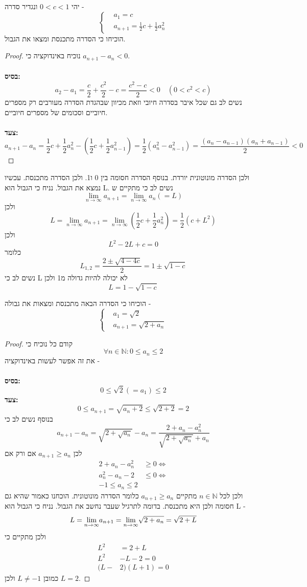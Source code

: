 \documentclass{article}
\begin{document}
\begin{exercise}
יהי 
$0<c<1$
ונגדיר סדרה - 
\[\begin{cases}&a_1 = c\\ &a_{n+1}=\frac{1}{2}c+\frac{1}{2}a_n^2\end{cases}\]
הוכיחו כי הסדרה מתכנסת ומצאו את הגבול.
\end{exercise}
\begin{proof}
נוכיח באינדוקציה כי 
$a_{n+1}-a_n<0$. \\\\
\textbf{בסיס:}
\[a_2-a_1=\frac{c}{2}+\frac{c^2}{2}-c = \frac{c^2-c}{2}<0 \quad(0<c^2<c)\]
נשים לב גם שכל איבר בסדרה חיובי וזאת מכיוון שבהגדת הסדרה מעורבים רק מספרים חיוביים וסכומים  של מספרים חיוביים. \\\\
\textbf{צעד:} 
\[a_{n+1}-a_n = \frac{1}{2} c+\frac{1}{2}a_n^2 - \left(\frac{1}{2}c+\frac{1}{2} a_{n-1}^2\right) = \frac{1}{2}\left(a_n^2-a_{n-1}^2\right)=\frac{(a_n-a_{n-1})(a_n+a_{n-1})}{2}<0\]
\end{proof}
 ולכן הסדרה מונוטונית יורדת. בנוסף הסדרה חסומה בין 0 ו1. ולכן הסדרה מתכנסת. עכשיו נמצא את הגבול. נניח כי הגבול הוא L. נשים לב כי מתקיים ש 
\[\underset{n\rightarrow\infty}{\lim} a_{n+1} = \underset{n\rightarrow\infty}{\lim}a_n(=L)\]
ולכן 
\[L=\underset{n\rightarrow\infty}{\lim} a_{n+1} = \underset{n\rightarrow\infty}{\lim}\left(\frac{1}{2}c+\frac{1}{2}a_n^2\right) = \frac{1}{2}\left(c+L^2\right) \]
ולכן 
\[L^2-2L+c=0\]
כלומר 
\[L_{1,2}=\frac{2\pm \sqrt{4-4c}}{2} = 1\pm \sqrt{1-c}\]
נשים לב כי L לא יכולה להיות גדולה מ1 ולכן 
\[L=1-\sqrt{1-c}\]
\begin{exercise}
הוכיחו כי הסדרה הבאה מתכנסת ומצאות את גבולה - 
\[\begin{cases}&a_1= \sqrt{2} \\ &a_{n+1}= \sqrt{2+a_n}\end{cases}\]
\end{exercise}
\begin{proof}
קודם כל נוכיח כי 
\[\forall n\in\mathbb{N}: 0\leq a_n\leq 2\]
את זה אפשר לעשות באינדוקציה - \\\\
\textbf{בסיס:}
\[0\leq\sqrt{2}(=a_1)\leq 2\]
\textbf{צעד:}
\[0\leq a_{n+1}=\sqrt{a_n+2}\leq \sqrt{2+2} =2\]
בנוסף נשים לב כי
\[a_{n+1}-a_n = \sqrt{2+\sqrt{a_n}}-a_n = \frac{2+a_n-a_n^2}{\sqrt{2+\sqrt{a_n}} +a_n}\]
לכן 
$a_{n+1}\geq a_n$
אם ורק אם 
\begin{align*}
2+a_n-a_n^2&\geq 0 \Longleftrightarrow\\
a_n^2-a_n-2&\leq 0 \Longleftrightarrow \\
-1\leq a_n\leq 2
\end{align*}
ולכן לכל 
$n\in\mathbb{N}$ 
מתקיים 
$a_{n+1}\geq a_n$
כלומר הסדרה מונוטונית. הוכחנו כאמור שהיא גם חסומה ולכן היא מתכנסת. בדומה לתרגיל שעבר נחשב את הגבול. נניח כי הגבול הוא L - 
\[L = \underset{n\rightarrow\infty}{\lim} a_{n+1} = \underset{n\rightarrow\infty}{\lim} \sqrt{2+a_n} = \sqrt{2+L}\]
ולכן מתקיים כי 
\begin{align*}
L^2&=2+L \\
L^2&-L-2=0 \\
(L-&2)(L+1) = 0
\end{align*}
כמובן 
$L\neq -1$
ולכן 
$L=2$.
\end{proof}
\end{document}
